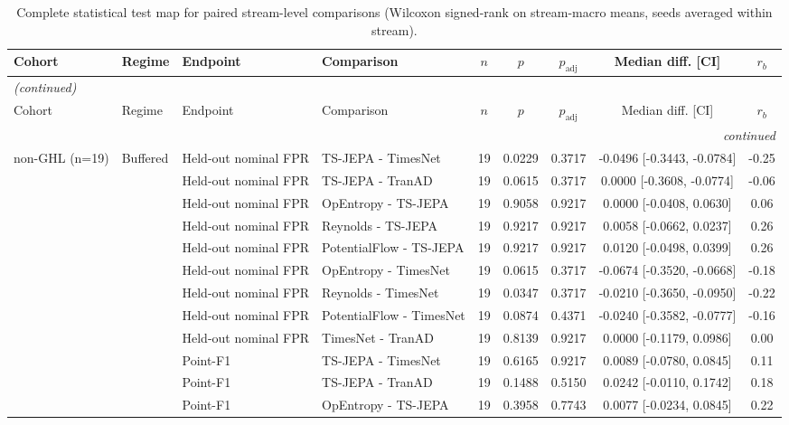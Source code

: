 {\scriptsize
\begin{longtable}{@{}llllccccc@{}}
\caption{Complete statistical test map for paired stream-level comparisons (Wilcoxon signed-rank on stream-macro means, seeds averaged within stream).}\label{tab:test_map}\\
\toprule
Cohort & Regime & Endpoint & Comparison & $n$ & $p$ & $p_{\mathrm{adj}}$ & Median diff. [CI] & $r_b$ \\
\midrule
\endfirsthead
\multicolumn{9}{l}{\emph{(continued)}}\\
\toprule
Cohort & Regime & Endpoint & Comparison & $n$ & $p$ & $p_{\mathrm{adj}}$ & Median diff. [CI] & $r_b$ \\
\midrule
\endhead
\midrule\multicolumn{9}{r}{\emph{continued}}\\
\endfoot
\bottomrule
\endlastfoot
non-GHL (n=19) & Buffered & Held-out nominal FPR & TS-JEPA - TimesNet & 19 & 0.0229 & 0.3717 & -0.0496 [-0.3443, -0.0784] & -0.25 \\
 &  & Held-out nominal FPR & TS-JEPA - TranAD & 19 & 0.0615 & 0.3717 & 0.0000 [-0.3608, -0.0774] & -0.06 \\
 &  & Held-out nominal FPR & OpEntropy - TS-JEPA & 19 & 0.9058 & 0.9217 & 0.0000 [-0.0408, 0.0630] & 0.06 \\
 &  & Held-out nominal FPR & Reynolds - TS-JEPA & 19 & 0.9217 & 0.9217 & 0.0058 [-0.0662, 0.0237] & 0.26 \\
 &  & Held-out nominal FPR & PotentialFlow - TS-JEPA & 19 & 0.9217 & 0.9217 & 0.0120 [-0.0498, 0.0399] & 0.26 \\
 &  & Held-out nominal FPR & OpEntropy - TimesNet & 19 & 0.0615 & 0.3717 & -0.0674 [-0.3520, -0.0668] & -0.18 \\
 &  & Held-out nominal FPR & Reynolds - TimesNet & 19 & 0.0347 & 0.3717 & -0.0210 [-0.3650, -0.0950] & -0.22 \\
 &  & Held-out nominal FPR & PotentialFlow - TimesNet & 19 & 0.0874 & 0.4371 & -0.0240 [-0.3582, -0.0777] & -0.16 \\
 &  & Held-out nominal FPR & TimesNet - TranAD & 19 & 0.8139 & 0.9217 & 0.0000 [-0.1179, 0.0986] & 0.00 \\
 &  & Point-F1 & TS-JEPA - TimesNet & 19 & 0.6165 & 0.9217 & 0.0089 [-0.0780, 0.0845] & 0.11 \\
 &  & Point-F1 & TS-JEPA - TranAD & 19 & 0.1488 & 0.5150 & 0.0242 [-0.0110, 0.1742] & 0.18 \\
 &  & Point-F1 & OpEntropy - TS-JEPA & 19 & 0.3958 & 0.7743 & 0.0077 [-0.0234, 0.0845] & 0.22 \\

\end{longtable}}
